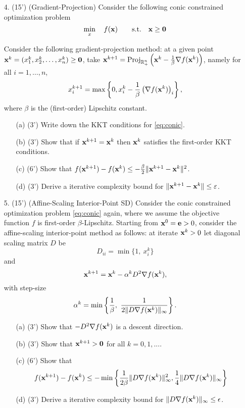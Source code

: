 \documentclass[12pt,letterpaper]{article}
\newcommand\e{{\bf e}}
\newcommand\x{{\bf x}}
\newcommand\bz{{\bf 0}}
\begin{document}
\begin{enumerate}
\item[4.] (15') (Gradient-Projection) Consider the following conic constrained optimization problem
\begin{equation}
	\min_{x} \quad f(\x) \qquad \mathrm{s.t.} \quad \x \geq \bz
	\label{eq:conic}
\end{equation}

Consider the following gradient-projection method: at a given point $\x^k = (x^k_1, x^k_2, \dots, x^k_n)\ge \bz$, 
take $\x^{k+1} = \mathrm{Proj}_{\mathbb{R}^n_+} \left(\x^k- \frac{1}{\beta} \nabla f(\x^k) \right)$,
namely for all $i = 1,\ldots, n$,
\[
	x_i^{k+1}=\max \left\{0, x_i^k- \frac{1}{\beta} \left(\nabla f(\x^k) \right)_i \right\},
\]
where $\beta$ is the (first-order) Lipschitz constant.

\begin{enumerate}
\item [(a)] (3') Write down the KKT conditions for \eqref{eq:conic}.
\item [(b)] (3') Show that if $\x^{k+1} = \x^k$ then $\x^k$ satisfies the first-order KKT conditions.
\item [(c)] (6') Show that $f(\x^{k+1}) - f(\x^k) \leq - \frac{\beta}{2} \|\x^{k+1} - \x^k\|^2$.
\item [(d)] (3') Derive a iterative complexity bound for $\|\x^{k+1} - \x^k\| \leq \varepsilon$.
\end{enumerate}

\item[5.] (15') (Affine-Scaling Interior-Point SD) 
Consider the conic constrained optimization problem \eqref{eq:conic} again, where we assume the objective function $f$ is first-order $\beta$-Lipschitz.
Starting from $\x^0=\e>0$, consider the affine-scaling interior-point method as follows: at iterate $\x^k>0$ let diagonal scaling matrix $D$ be
\[D_{ii}=\min\{1,\ x^k_i\}\]
and
\[\x^{k+1}=\x^k-\alpha^kD^2\nabla f(\x^k),\]
with step-size
\[\alpha^k=\min \left\{\frac{1}{\beta},\ \frac{1}{2\|D\nabla f(\x^k)\|_{\infty}} \right\}.\]
\begin{enumerate}
\item[(a)] (3') Show that $-D^2 \nabla f(\x^k)$ is a descent direction.

\item[(b)] (3') Show that $\x^{k+1}>\bz$ for all $k=0,1,...$.

\item[(c)] (6') Show that 
\[
	f(\x^{k+1}) - f(\x^k) \leq -\min \left\{ \frac{1}{2\beta} \|D \nabla f(\x^k)\|_\infty^2, \frac{1}{4} \| D \nabla f(\x^k) \|_\infty \right\}	
\] 
\item[(d)] (3') Derive a iterative complexity bound for $\|D\nabla f(\x^k)\|_{\infty}\le \epsilon$.
\end{enumerate}

\clearpage

\end{enumerate}
\end{document}
